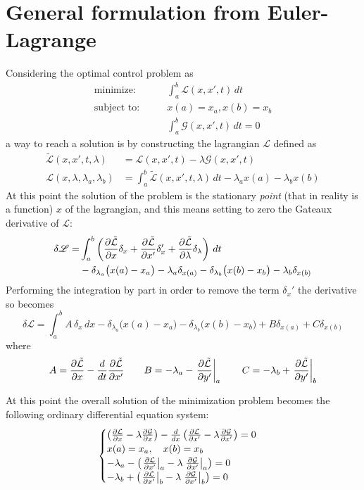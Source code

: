 \section{General formulation from Euler-Lagrange}
	Considering the optimal control problem as
	\begin{equation} \begin{aligned}
		\textrm{minimize:} \qquad & \int_a^b \mathcal L(x,x',t)\, dt \\
		\textrm{subject to:}\qquad & x(a) = x_a, x(b) =x_b \\
		& \int_a^b \mathcal G(x,x',t)\,dt = 0
	\end{aligned} \end{equation}
	a way to reach a solution is by constructing the lagrangian $\mathscr L$ defined as
	\begin{equation}
	\begin{aligned}
		\tilde{\mathcal L}(x,x',t, \lambda) &  = \mathcal L(x,x',t) - \lambda \mathcal G(x,x',t) \\
		\mathscr L (x,\lambda,\lambda_a,\lambda_b) & = \int_a^b \tilde{\mathcal L}(x,x',t,\lambda)\,dt - \lambda_a x(a) - \lambda_b x(b)
	\end{aligned}
	\end{equation}
	At this point the solution of the problem is the stationary \textit{point} (that in reality is a function) $x$ of the lagrangian, and this means setting to zero the Gateaux derivative of $\mathscr L$:
	\begin{align*}
		\delta \mathscr L = &  \int_a^b \left( \frac{\partial \tilde{\mathcal L}}{\partial x} \delta_x + \frac{\partial \tilde{\mathcal L}}{\partial x'} \delta_x' + \frac{\partial \tilde{\mathcal L}}{\partial \lambda} \delta_\lambda \right)\, dt \\ & - \delta_{\lambda_a} \big(x(a)-x_a\big) - \lambda_a \delta_{x(a)} - \delta_{\lambda_b} \big(x(b)-x_b\big) - \lambda_b \delta_{x(b)}
	\end{align*}
	Performing the integration by part in order to remove the term $\delta_x'$ the derivative so becomes
	\[ \delta \mathscr L = \int_a^b A\,\delta_x\, dx - \delta_{\lambda_a} \big(x(a)-x_a\big) - \delta_{\lambda_b}\big(x(b)-x_b\big) + B \delta_{x(a)} + C\delta_{x(b)} \]
	where
	\[ A = \frac{\partial \tilde{\mathcal L}}{\partial x} - \frac d{dt}\frac{\partial \tilde{\mathcal L}}{\partial x'} \qquad B = -\lambda_a  -\left.\frac{\partial \tilde{\mathcal L}}{\partial y'} \right|_a  \qquad C = -\lambda_b  + \left. \frac{\partial \tilde{\mathcal L}}{\partial y'} \right|_b \]
	
	At this point the overall solution of the minimization problem becomes the following ordinary differential equation system:
	\begin{equation}
	\begin{cases}
		\left(\frac{\partial \mathcal L}{\partial x} - \lambda \frac{\partial \mathcal G}{\partial x} \right) - \frac d{dx}
		\left(\frac{\partial \mathcal L}{\partial x'} - \lambda \frac{\partial \mathcal G}{\partial x'} \right) = 0 \\
		x(a) = x_a, \quad x(b) = x_b \\
		-\lambda_a - \left( \left.\frac{\partial \mathcal L}{\partial x'}\right|_a - \lambda \left. \frac{\partial \mathcal G}{\partial x'} \right|_a \right) = 0\\
		-\lambda_b + \left( \left.\frac{\partial \mathcal L}{\partial x'}\right|_b - \lambda \left. \frac{\partial \mathcal G}{\partial x'} \right|_b \right) = 0
	\end{cases}
	\end{equation}
	
